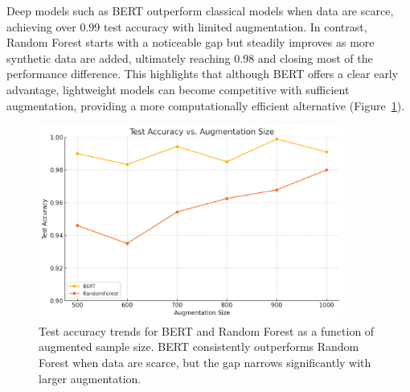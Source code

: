 \documentclass{article}
\begin{document}




Deep models such as BERT outperform classical models when data are scarce, achieving over 0.99 test accuracy with limited augmentation. In contrast, Random Forest starts with a noticeable gap but steadily improves as more synthetic data are added, ultimately reaching 0.98 and closing most of the performance difference. This highlights that although BERT offers a clear early advantage, lightweight models can become competitive with sufficient augmentation, providing a more computationally efficient alternative (Figure~\ref{fig:test_accuracy}).


\begin{figure}[H]
    \centering
    \includegraphics[width=10cm]{output (1).png}
    \caption{Test accuracy trends for BERT and Random Forest as a function of augmented sample size. BERT consistently outperforms Random Forest when data are scarce, but the gap narrows significantly with larger augmentation.}
    \label{fig:test_accuracy}
\end{figure}
\end{document}
